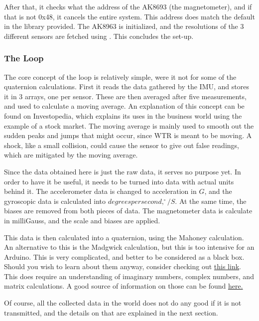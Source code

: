 After that, it checks what the address of the AK8693 (the magnetometer), and if that is not 0x48, it cancels the entire system.
This address does match the default in the library provided.
The AK8963 is initialized, and the resolutions of the 3 different sensors are fetched using .
This concludes the set-up.


\subsubsection{The Loop}
The core concept of the loop is relatively simple, were it not for some of the quaternion calculations.
First it reads the data gathered by the IMU, and stores it in 3 arrays, one per sensor.
These are then averaged after five measurements, and used to calculate a moving average.
An explanation of this concept can be found on Investopedia, which explains its uses in the business world \cite{movingavg} using the example of a stock market.
The moving average is mainly used to smooth out the sudden peaks and jumps that might occur, since WTR is meant to be moving.
A shock, like a small collision, could cause the sensor to give out false readings, which are mitigated by the moving average.

Since the data obtained here is just the raw data, it serves no purpose yet.
In order to have it be useful, it needs to be turned into data with actual units behind it.
The accelerometer data is changed to acceleration in $G$, and the gyroscopic data is calculated into $degrees per second,  ^{\circ}/S $.
At the same time, the biases are removed from both pieces of data.
The magnetometer data is calculate in milliGauss, and the scale and biases are applied.

This data is then calculated into a quaternion, using the Mahoney calculation.
An alternative to this is the Madgwick calculation, but this is too intensive for an Arduino.
This is very complicated, and better to be considered as a black box.
Should you wish to learn about them anyway, consider checking out \href{http://www.ijcee.org/vol10/974-T4004.pdf}{this link}.
This does require an understanding of imaginary numbers, complex numbers, and matrix calculations.
A good source of information on those can be found \href{https://www.3dgep.com/understanding-quaternions/#The_Complex_Plane}{here.}

Of course, all the collected data in the world does not do any good if it is not transmitted, and the details on that are explained in the next section.

